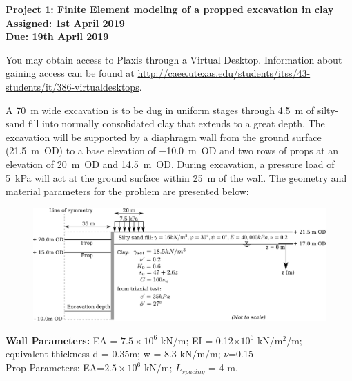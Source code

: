 \documentclass[a4paper,12pt]{article}
\begin{document}
\begin{centering}
	\textbf{
		Project 1: Finite Element modeling of a propped excavation in clay\\
		Assigned: 1st April 2019\\
		Due: 19th April 2019\\
	}
\end{centering}

\vspace{1em}

You may obtain access to Plaxis through a Virtual Desktop.  Information about gaining access can be found at \url{ http://caee.utexas.edu/students/itss/43-students/it/386-virtualdesktops}.  

A \SI{70}{\meter} wide excavation is to be dug in uniform stages through 
\SI{4.5}{\meter} of silty-sand fill into normally consolidated clay that 
extends to a great depth. The excavation will be supported by a diaphragm wall 
from the ground surface (\SI{+21.5}{\meter}~OD) to a base elevation of 
\SI{-10.0}{\meter}~OD and two rows of props at an elevation of 
\SI{+20}{\meter}~OD and \SI{+14.5}{\meter}~OD.  During excavation, a pressure 
load of \SI{5}{\kilo\pascal} will act at the ground surface within 
\SI{25}{\meter} of the wall.  The geometry and material parameters for the 
problem are presented below:

\begin{figure}[h]
	\includegraphics[width=\textwidth]{Problem.pdf}
\end{figure}

\begin{center}
	\textbf{Wall Parameters:} EA = $7.5\times 10^6$ kN/m; EI = 0.12$\times10^6$ 
	kN/m$^2$/m; \\ equivalent thickness d = 0.35m; w = 8.3 kN/m/m; $\nu$=0.15 \\
	Prop Parameters: EA=$2.5\times10^6$ kN/m; $L_{spacing}$ = 4 m.
\end{center}
\end{document}
